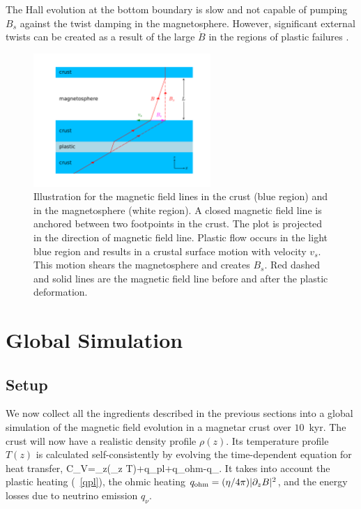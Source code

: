 The Hall evolution at the bottom boundary is slow and not capable of pumping 
$B_s$ against the twist damping in the magnetosphere. 
However, significant external twists can 
be created as a result of the large $\dot{B}$ in the regions of plastic 
failures \citep{2014ApJ...794L..24B}. 

\begin{figure}[t]
\centering
\includegraphics[width=0.6\textwidth]{pics/chap2/twist.pdf} 
\caption[Illustration for the magnetic field lines in the crust and in the 
magnetosphere]{Illustration for the magnetic field lines in the crust (blue region) and in the 
magnetosphere (white region). 
A closed magnetic field line is anchored between two footpoints in the crust. The plot is projected in the direction of magnetic field line.
Plastic flow 
occurs
in the light blue region and 
results in a crustal surface motion
with velocity $v_s$. This motion shears the magnetosphere 
and creates $B_s$.
Red dashed and solid lines are the magnetic field line before and after 
the plastic deformation. 
}
\label{fig1}
\end{figure}

\section{Global Simulation}
\label{sim}

\subsection{Setup}

We now collect all the ingredients described in the previous sections into a 
global simulation of the magnetic field evolution in a magnetar crust over $10$~kyr.
The crust will now have a realistic density profile $\rho(z)$. Its temperature profile $T(z)$ is calculated self-consistently by evolving the time-dependent equation for heat transfer,
\beq\label{heat}
 C_V=\partial_z\left(\kappa \partial_z T\right)+q_{\rm pl}+q_{\rm ohm}-q_{\nu}.
 \eeq
It takes into account the plastic heating (\Eq~\ref{qpl}), the ohmic heating $q_{\rm ohm}=(\eta/4\pi)|\partial_zB|^2$, and the energy losses due to neutrino emission $q_\nu$.

